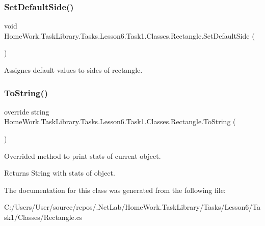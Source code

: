 \subsubsection{\texorpdfstring{SetDefaultSide()}{SetDefaultSide()}}
{\footnotesize\ttfamily void Home\+Work.\+Task\+Library.\+Tasks.\+Lesson6.\+Task1.\+Classes.\+Rectangle.\+Set\+Default\+Side (\begin{DoxyParamCaption}{ }\end{DoxyParamCaption})\hspace{0.3cm}{\ttfamily [private]}}



Assignes default values to sides of rectangle. 

\mbox{\label{class_home_work_1_1_task_library_1_1_tasks_1_1_lesson6_1_1_task1_1_1_classes_1_1_rectangle_afc15463fc68808e39b2bc7d791582260}} 
\subsubsection{\texorpdfstring{ToString()}{ToString()}}
{\footnotesize\ttfamily override string Home\+Work.\+Task\+Library.\+Tasks.\+Lesson6.\+Task1.\+Classes.\+Rectangle.\+To\+String (\begin{DoxyParamCaption}{ }\end{DoxyParamCaption})}



Overrided method to print stats of current object. 

\begin{DoxyReturn}{Returns}
String with stats of object.
\end{DoxyReturn}


The documentation for this class was generated from the following file\+:\begin{DoxyCompactItemize}
\item 
C\+:/\+Users/\+User/source/repos/.\+Net\+Lab/\+Home\+Work.\+Task\+Library/\+Tasks/\+Lesson6/\+Task1/\+Classes/Rectangle.\+cs\end{DoxyCompactItemize}
